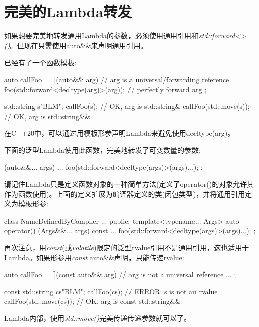 \section{完美的Lambda转发}
如果想要完美地转发通用Lambda的参数，必须使用通用引用和\textit{std::forward<>()}。但现在只需使用auto\&\&来声明通用引用。

已经有了一个函数模板:

\begin{cppcode}
auto callFoo = [](auto&& arg) { // arg is a universal/forwarding reference
	foo(std::forward<decltype(arg)>(arg)); // perfectly forward arg
};

std::string s{"BLM"};
callFoo(s); // OK, arg is std::string&
callFoo(std::move(s)); // OK, arg is std::string&&
\end{cppcode}

在C++20中，可以通过用模板形参声明Lambda来避免使用decltype(arg)。

下面的泛型Lambda使用此函数，完美地转发了可变数量的参数:

\begin{cppcode}
[] (auto&&... args) {
	...
	foo(std::forward<decltype(args)>(args)...);
};
\end{cppcode}

请记住Lambda只是定义函数对象的一种简单方法(定义了operator()的对象允许其作为函数使用)。上面的定义扩展为编译器定义的类(闭包类型)，并将通用引用定义为模板形参:

\begin{cppcode}
class NameDefinedByCompiler {
	...
	public:
	template<typename... Args>
	auto operator() (Args&&... args) const {
		...
		foo(std::forward<decltype(args)>(args)...);
	}
};
\end{cppcode}

再次注意，用\textit{const}(或\textit{volatile})限定的泛型rvalue引用不是通用引用，这也适用于Lambda。如果形参用\textit{const} auto\&\&声明，只能传递rvalue:

\begin{cppcode}
auto callFoo = [](const auto&& arg) { // arg is not a universal reference
	...
};

const std::string cs{"BLM"};
callFoo(cs); // ERROR: s is not an rvalue
callFoo(std::move(cs)); // OK, arg is const std::string&&
\end{cppcode}

Lambda内部，使用\textit{std::move()}完美传递传递参数就可以了。
















































